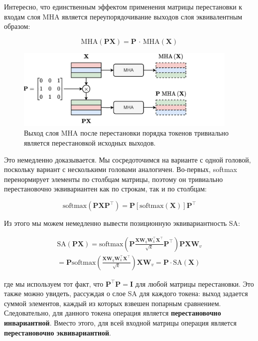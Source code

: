 Интересно, что единственным эффектом применения матрицы перестановки к входам слоя MHA является переупорядочивание выходов слоя эквивалентным образом:

$$
\text{MHA}(\mathbf{P}\mathbf{X})=\mathbf{P}\,\cdot\,\text{MHA}(\mathbf{X})
$$

\begin{figure}[t]
    \centering
    \includegraphics[width=0.95\textwidth]{images/permutation_equivariance}
    \caption{Выход слоя MHA после перестановки порядка токенов тривиально является перестановкой исходных выходов.}
    \label{fig:permutation_equivariance_mha}
\end{figure}

Это немедленно доказывается. Мы сосредоточимся на варианте с одной головой, поскольку вариант с несколькими головами аналогичен. Во-первых, softmax перенормирует элементы по столбцам матрицы, поэтому он тривиально перестановочно эквивариантен как по строкам, так и по столбцам:

$$
\text{softmax}(\mathbf{P}\mathbf{X}\mathbf{P}^\top)=\mathbf{P}\left[\text{softmax}(\mathbf{X})\right]\mathbf{P}^\top
$$

Из этого мы можем немедленно вывести позиционную эквивариантность SA:

\begin{gather}
\text{SA}(\mathbf{P}\mathbf{X}) = \text{softmax}\left(\mathbf{P}\frac{\mathbf{X}\mathbf{W}_q\mathbf{W}_k^\top\mathbf{X}^\top}{\sqrt{k}}\mathbf{P}^\top\right)\mathbf{P}\mathbf{X}\mathbf{W}_v \\
= \mathbf{P}\text{softmax}\left(\frac{\mathbf{X}\mathbf{W}_q\mathbf{W}_k^\top\mathbf{X}^\top}{\sqrt{k}}\right)\mathbf{X}\mathbf{W}_v = \mathbf{P}\cdot\text{SA}(\mathbf{X})
\end{gather}

где мы используем тот факт, что $\mathbf{P}^\top \mathbf{P} = \mathbf{I}$ для любой матрицы перестановки. Это также можно увидеть, рассуждая о слое SA для каждого токена: выход задается суммой элементов, каждый из которых взвешен попарным сравнением. Следовательно, для данного токена операция является \textbf{перестановочно инвариантной}. Вместо этого, для всей входной матрицы операция является \textbf{перестановочно эквивариантной}.

